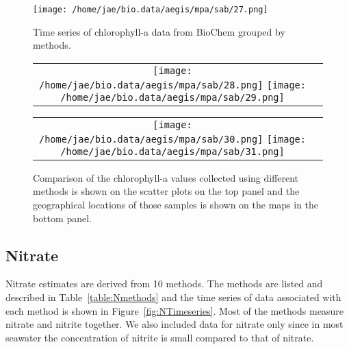 \documentclass[letterpaper,portrait,11pt]{scrartcl}
\numberwithin{equation}{section}    %
\numberwithin{figure}{section}    %
\numberwithin{table}{section}       %
\begin{document}
\begin{appendices}
\begin{figure}[h]
  \label{fig:ChlaTimeseries}
  \centering
  \texttt{[image: /home/jae/bio.data/aegis/mpa/sab/27.png]}
  \caption{Time series of chlorophyll-a data from BioChem grouped by methods.}
\end{figure}


\begin{figure}[h]
  \centering
  \begin{tabular}{cc}
    \texttt{[image: /home/jae/bio.data/aegis/mpa/sab/28.png]}
    \texttt{[image: /home/jae/bio.data/aegis/mpa/sab/29.png]} 
  \end{tabular}
  \begin{tabular}{cc}
    \texttt{[image: /home/jae/bio.data/aegis/mpa/sab/30.png]}
    \texttt{[image: /home/jae/bio.data/aegis/mpa/sab/31.png]}
  \end{tabular}
  \caption{Comparison of the chlorophyll-a values collected using different methods is shown on the scatter plots on the top panel and the geographical locations of those samples is shown on the maps in the bottom panel.}
  \label{fig:ChlaComparison}
\end{figure}


\subsection{Nitrate}

Nitrate estimates are derived from 10 methods. The methods are listed and described in Table~\ref{table:Nmethods} and the time series of data associated with each method is shown in Figure~\ref{fig:NTimeseries}. Most of the methods measure nitrate and nitrite together. We also included data for nitrate only since  in most seawater the concentration of nitrite is small compared to that of nitrate.


\end{appendices}
\end{document}
